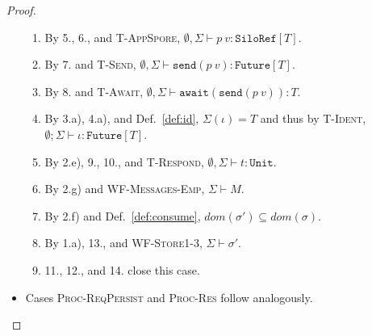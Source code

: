 \begin{proof}
\begin{itemize}
\begin{enumerate}
\item By 5., 6., and \textsc{T-AppSpore}, $\emptyset, \Sigma \vdash p~v : \texttt{SiloRef}[T]$.
\item By 7. and \textsc{T-Send}, $\emptyset, \Sigma \vdash \texttt{send}(p~v) : \texttt{Future}[T]$.
\item By 8. and \textsc{T-Await}, $\emptyset, \Sigma \vdash \texttt{await}(\texttt{send}(p~v)) : T$.
\item By 3.a), 4.a), and Def.~\ref{def:id}, $\Sigma(\iota) = T$ and thus by \textsc{T-Ident}, $\emptyset ; \Sigma \vdash \iota : \texttt{Future}[T]$.
\item By 2.e), 9., 10., and \textsc{T-Respond}, $\emptyset, \Sigma \vdash t : \texttt{Unit}$.
\item By 2.g) and \textsc{WF-Messages-Emp}, $\Sigma \vdash M$.
\item By 2.f) and Def.~\ref{def:consume}, $dom(\sigma') \subseteq dom(\sigma)$.
\item By 1.a), 13., and \textsc{WF-Store1-3}, $\Sigma \vdash \sigma'$.
\item 11., 12., and 14. close this case.
\end{enumerate}

\item Cases \textsc{Proc-ReqPersist} and \textsc{Proc-Res} follow analogously.

\end{itemize}
\end{proof}


